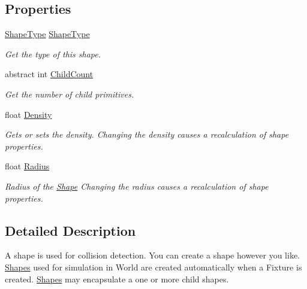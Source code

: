 \subsection*{Properties}
\begin{DoxyCompactItemize}
\item 
\hyperlink{namespace_farseer_physics_1_1_collision_1_1_shapes_a54e12281f639907006495f4af9f45d5e}{Shape\+Type} \hyperlink{class_farseer_physics_1_1_collision_1_1_shapes_1_1_shape_a4731b9af786f3e7b6dfaafdc12771e18}{Shape\+Type}
\begin{DoxyCompactList}\small\item\em Get the type of this shape. \end{DoxyCompactList}\item 
abstract int \hyperlink{class_farseer_physics_1_1_collision_1_1_shapes_1_1_shape_ab75c1a7dfb7c16017b8e3d4b0daf3d53}{Child\+Count}
\begin{DoxyCompactList}\small\item\em Get the number of child primitives. \end{DoxyCompactList}\item 
float \hyperlink{class_farseer_physics_1_1_collision_1_1_shapes_1_1_shape_a69dd415bc7de2c542b841862fb7a6583}{Density}
\begin{DoxyCompactList}\small\item\em Gets or sets the density. Changing the density causes a recalculation of shape properties. \end{DoxyCompactList}\item 
float \hyperlink{class_farseer_physics_1_1_collision_1_1_shapes_1_1_shape_a5c215611dc4f97f65b3da40c8f96f132}{Radius}
\begin{DoxyCompactList}\small\item\em Radius of the \hyperlink{class_farseer_physics_1_1_collision_1_1_shapes_1_1_shape}{Shape} Changing the radius causes a recalculation of shape properties. \end{DoxyCompactList}\end{DoxyCompactItemize}


\subsection{Detailed Description}
A shape is used for collision detection. You can create a shape however you like. \hyperlink{namespace_farseer_physics_1_1_collision_1_1_shapes}{Shapes} used for simulation in World are created automatically when a Fixture is created. \hyperlink{namespace_farseer_physics_1_1_collision_1_1_shapes}{Shapes} may encapsulate a one or more child shapes. 



